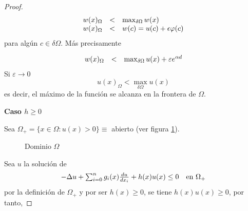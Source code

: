 \begin{proof}
\begin{equation*}
\begin{array}{l l l}
w(x)_\Omega & < & \max_{\delta\Omega} w(x) \\
w(x)_\Omega & < &  w(c) = u(c) + \epsilon\varphi(c)
\end{array}
\end{equation*}
para algún $c\in\delta\Omega$. Más precisamente

\begin{equation*}
\begin{array}{l l l}
w(x)_\Omega & < & \max_{\delta\Omega}u(x) + \varepsilon e^{\alpha d}
\end{array}
\end{equation*}
Si $\varepsilon\to0$
$$u(x)_\Omega < \max_{\delta\Omega}u(x)$$
es decir, el máximo de la función se alcanza en la frontera de $\Omega$.

\noindent\textbf{Caso $h \ge 0$}

Sea $\Omega_+ = \{x\in \Omega: u(x) > 0\} \equiv$ abierto (ver figura \ref{fig:omega-mas}).

\begin{figure}[ht]
\centering
{}
\caption{Dominio $\Omega$}
\label{fig:omega-mas}
\end{figure}

\noindent Sea $u$ la solución de 
\begin{equation*}
\begin{array}{l l}
-\Delta u + \sum_{i=0}^ng_i(x)\frac{du}{dx_i} + h(x)u(x)\le0 & \text{en } \Omega_+
\end{array}
\end{equation*}
por la definición de $\Omega_+$ y por ser $h(x) \ge 0$, se tiene $h(x)u(x) \ge 0$, por tanto, 


\end{proof}
